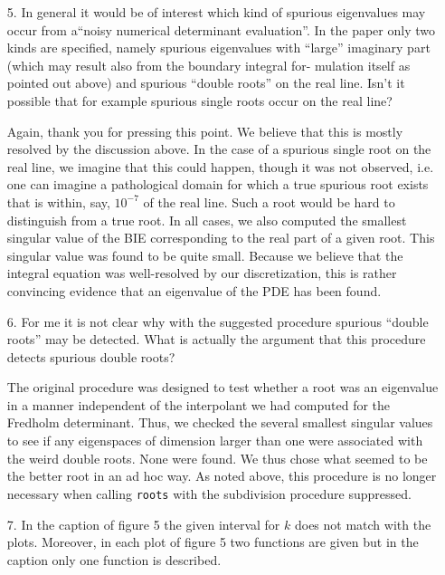 \documentclass{article}
\begin{document}
\begin{itemize}
\item[5.] {\color{blue}
  In general it would be of interest which kind of spurious eigenvalues may
occur from a“noisy numerical determinant evaluation”. In the paper
only two kinds are specified, namely spurious eigenvalues with “large”
imaginary part (which may result also from the boundary integral for-
mulation itself as pointed out above) and spurious “double roots” on
the real line. Isn’t it possible that for example spurious single roots
occur on the real line?}

Again, thank you for pressing this point. We believe that this
is mostly resolved by the discussion above. In the case of a spurious
single root on the real line, we imagine that this could happen, though it
was not observed, i.e. one can imagine a pathological domain for which a
true spurious root exists that is within, say, $10^{-7}$ of the real line.
Such a root would be hard to distinguish from a true root.
In all cases, we also computed the smallest singular
value of the BIE corresponding to the real part of a given root.
This singular value was found to be quite small. Because we believe
that the integral equation was well-resolved
by our discretization, this is rather convincing evidence that an
eigenvalue of the PDE has been found.

\item[6.] {\color{blue}
  For me it is not clear why with the suggested procedure spurious ``double roots''
  may be detected. What is actually the argument that this
  procedure detects spurious double roots?}

The original procedure was designed to test whether a root was
an eigenvalue in a manner independent of the interpolant we had
computed for the Fredholm determinant. Thus, we checked the several smallest
singular values to see if any eigenspaces of dimension larger
than one were associated
with the weird double roots. None were found. We thus chose what
seemed to be the better root in an ad hoc way. As noted above, this
procedure is no longer necessary when calling \texttt{roots} with
the subdivision procedure suppressed.

\item[7.] {\color{blue}In the caption of figure 5 the given interval for $k$
  does not match with the plots. Moreover, in each plot of figure
  5 two functions are given but in the caption only one function is described.}



\end{itemize}
\end{document}
